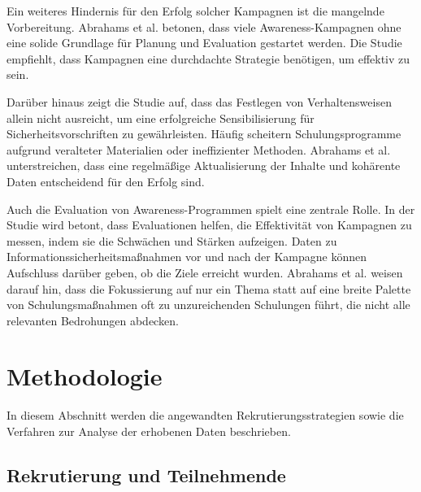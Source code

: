\documentclass[german,report]{i1thesis}
\begin{document}
Ein weiteres Hindernis für den Erfolg solcher Kampagnen ist die mangelnde Vorbereitung. Abrahams et al. \cite{abrahams2024cybersecurity} betonen, dass viele Awareness-Kampagnen ohne eine solide Grundlage für Planung und Evaluation gestartet werden. Die Studie empfiehlt, dass Kampagnen eine durchdachte Strategie benötigen, um effektiv zu sein.

Darüber hinaus zeigt die Studie auf, dass das Festlegen von Verhaltensweisen allein nicht ausreicht, um eine erfolgreiche Sensibilisierung für Sicherheitsvorschriften zu gewährleisten. Häufig scheitern Schulungsprogramme aufgrund veralteter Materialien oder ineffizienter Methoden. Abrahams et al. \cite{abrahams2024cybersecurity} unterstreichen, dass eine regelmäßige Aktualisierung der Inhalte und kohärente Daten entscheidend für den Erfolg sind.

Auch die Evaluation von Awareness-Programmen spielt eine zentrale Rolle. In der Studie wird betont, dass Evaluationen helfen, die Effektivität von Kampagnen zu messen, indem sie die Schwächen und Stärken aufzeigen. Daten zu Informationssicherheitsmaßnahmen vor und nach der Kampagne können Aufschluss darüber geben, ob die Ziele erreicht wurden. Abrahams et al. \cite{abrahams2024cybersecurity} weisen darauf hin, dass die Fokussierung auf nur ein Thema statt auf eine breite Palette von Schulungsmaßnahmen oft zu unzureichenden Schulungen führt, die nicht alle relevanten Bedrohungen abdecken.

\section{Methodologie}
\label{sec:methodology}

In diesem Abschnitt werden die angewandten Rekrutierungsstrategien sowie die Verfahren zur Analyse der erhobenen Daten beschrieben.

\subsection{Rekrutierung und Teilnehmende}
\end{document}
